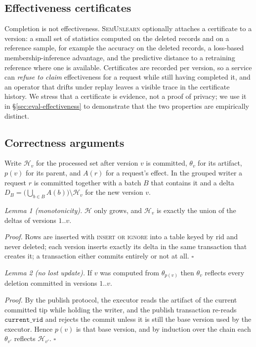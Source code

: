 \documentclass[conference]{IEEEtran}
\newcommand{\sys}{\textsc{SemUnlearn}}
\newcommand{\Hset}{\mathcal{H}}
\begin{document}
\subsection{Effectiveness certificates}
\label{sec:cert}

Completion is not effectiveness.  \sys{} optionally attaches a certificate to a
version: a small set of statistics computed on the deleted records and on a
reference sample, for example the accuracy on the deleted records, a loss-based
membership-inference advantage, and the predictive distance to a retraining
reference where one is available.  Certificates are recorded per version, so a
service can \emph{refuse to claim} effectiveness for a request while still having
completed it, and an operator that drifts under replay leaves a visible trace in the
certificate history.  We stress that a certificate is evidence, not a proof of
privacy; we use it in \S\ref{sec:eval-effectiveness} to demonstrate that the two
properties are empirically distinct.

\subsection{Correctness arguments}
\label{sec:proofs}

Write $\Hset_v$ for the processed set after version $v$ is committed, $\theta_v$ for
its artifact, $p(v)$ for its parent, and $A(r)$ for a request's effect.  In the
grouped writer a request $r$ is committed together with a batch $B$ that contains it
and a delta $D_B=\big(\bigcup_{b\in B}A(b)\big)\setminus\Hset_{v}$ for the new version
$v$.

\emph{Lemma 1 (monotonicity).} $\Hset$ only grows, and $\Hset_v$ is exactly the union
of the deltas of versions $1..v$.

\emph{Proof.} Rows are inserted with \textsc{insert or ignore} into a table keyed by
$\mathrm{rid}$ and never deleted; each version inserts exactly its delta in the same
transaction that creates it; a transaction either commits entirely or not at all.
\hfill$\square$

\emph{Lemma 2 (no lost update).} If $v$ was computed from $\theta_{p(v)}$ then
$\theta_v$ reflects every deletion committed in versions $1..v$.

\emph{Proof.} By the publish protocol, the executor reads the artifact of the current
committed tip while holding the writer, and the publish transaction re-reads
$\texttt{current\_vid}$ and rejects the commit unless it is still the base version
used by the executor.  Hence $p(v)$ is that base version, and by induction over the
chain each $\theta_{v'}$ reflects $\Hset_{v'}$. \hfill$\square$
\end{document}
